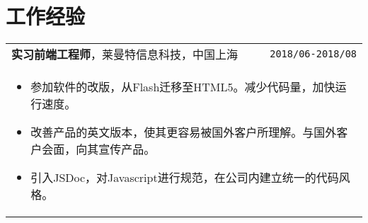 \documentclass[UTF8]{ctexart}
\newcommand{\itemcols}[1]{
	\multicolumn{2}{p{\dimexpr \linewidth-2\tabcolsep}}{
		\begin{itemize}
			#1
		\end{itemize}
	}
}
\begin{document}
	\section{工作经验}
	\smallskip
	\noindent
	\begin{tabularx}{\textwidth}{X r}
		\textbf{\large 实习前端工程师}，莱曼特信息科技，中国上海 & \texttt{2018/06-2018/08} \\
		\itemcols{
			\item 参加软件的改版，从Flash迁移至HTML5。减少代码量，加快运行速度。
			\item 改善产品的英文版本，使其更容易被国外客户所理解。与国外客户会面，向其宣传产品。
			\item 引入JSDoc，对Javascript进行规范，在公司内建立统一的代码风格。
		} 
	\end{tabularx}
	
	
\end{document}
